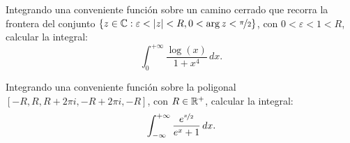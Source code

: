 \begin{ejercicio}
    Integrando una conveniente función sobre un camino cerrado que recorra la frontera del conjunto $\{z \in \mathbb{C} : \varepsilon < |z| < R, 0 < \arg z < \nicefrac{\pi}{2}\}$, con $0 < \varepsilon < 1 < R$, calcular la integral:
    \begin{equation*}
        \int_0^{+\infty} \frac{\log(x)}{1 + x^4} \, dx.
    \end{equation*}
\end{ejercicio}

\begin{ejercicio}
    Integrando una conveniente función sobre la poligonal $[-R, R, R + 2\pi i, -R + 2\pi i, -R]$, con $R \in \mathbb{R}^+$, calcular la integral:
    \begin{equation*}
        \int_{-\infty}^{+\infty} \frac{e^{\nicefrac{x}{2}}}{e^x + 1} \, dx.
    \end{equation*}
\end{ejercicio}